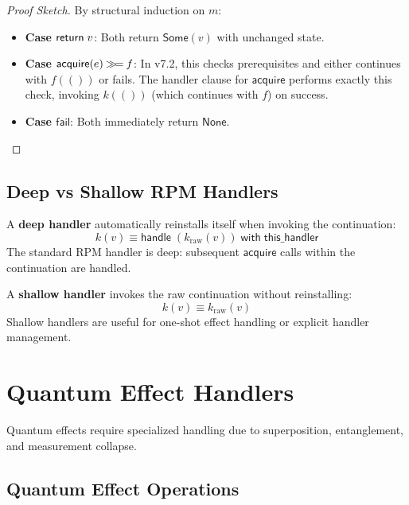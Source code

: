 \begin{proof}[Proof Sketch]
By structural induction on $m$:
\begin{itemize}
  \item \textbf{Case $\mathsf{return}\; v$}: Both return $\mathsf{Some}(v)$ with unchanged state.
  \item \textbf{Case $\mathsf{acquire}(e) \mathbin{\gg\!=} f$}: In v7.2, this checks prerequisites and either continues with $f(())$ or fails. The handler clause for $\mathsf{acquire}$ performs exactly this check, invoking $k(())$ (which continues with $f$) on success.
  \item \textbf{Case $\mathsf{fail}$}: Both immediately return $\mathsf{None}$.
\end{itemize}
\end{proof}

\subsection{Deep vs Shallow RPM Handlers}
\label{subsec:deep-shallow}

\begin{definition}
\label{def:deep-handler}
A \textbf{deep handler} automatically reinstalls itself when invoking the continuation:
\[
k(v) \equiv \mathsf{handle}\; (k_{\mathrm{raw}}(v))\; \mathsf{with}\; \mathsf{this\_handler}
\]
The standard RPM handler is deep: subsequent $\mathsf{acquire}$ calls within the continuation are handled.
\end{definition}

\begin{definition}
\label{def:shallow-handler}
A \textbf{shallow handler} invokes the raw continuation without reinstalling:
\[
k(v) \equiv k_{\mathrm{raw}}(v)
\]
Shallow handlers are useful for one-shot effect handling or explicit handler management.
\end{definition}

\section{Quantum Effect Handlers}
\label{sec:quantum-effect-handlers}

Quantum effects require specialized handling due to superposition, entanglement, and measurement collapse.

\subsection{Quantum Effect Operations}
\label{subsec:quantum-effect-ops}

